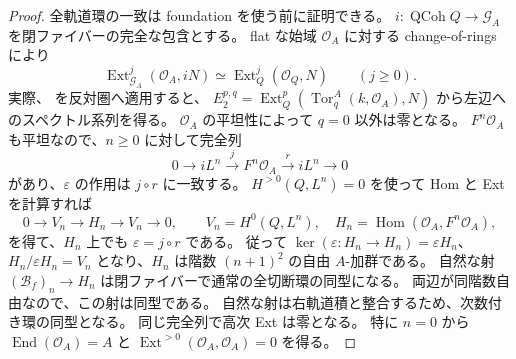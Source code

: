\begin{proof}
全軌道環の一致は foundation を使う前に証明できる。
$i:\operatorname{QCoh}Q\to\mathcal G_A$ を閉ファイバーの完全な包含とする。
flat な始域 $\mathcal O_A$ に対する change-of-rings により
\[
 \operatorname{Ext}^j_{\mathcal G_A}(\mathcal O_A,iN)
 \simeq\operatorname{Ext}^j_Q(\mathcal O_Q,N)\qquad(j\ge0).
\]
実際、\cite[Proposition 4.7]{LowenVanDenBergh2006} を反対圏へ適用すると、
$E_2^{p,q}=\operatorname{Ext}^p_Q(\operatorname{Tor}^A_q(k,\mathcal O_A),N)$
から左辺へのスペクトル系列を得る。
$\mathcal O_A$ の平坦性によって $q=0$ 以外は零となる。
$F^n\mathcal O_A$ も平坦なので、$n\ge0$ に対して完全列
\[
 0\longrightarrow iL^n\xrightarrow{j}F^n\mathcal O_A
   \xrightarrow{r}iL^n\longrightarrow0
\]
があり、$\varepsilon$ の作用は $j\circ r$ に一致する。
$H^{>0}(Q,L^n)=0$ を使って Hom と Ext を計算すれば
\[
 0\longrightarrow V_n\longrightarrow H_n\longrightarrow V_n\longrightarrow0,
 \qquad V_n=H^0(Q,L^n),\quad
 H_n=\operatorname{Hom}(\mathcal O_A,F^n\mathcal O_A),
\]
を得て、$H_n$ 上でも $\varepsilon=j\circ r$ である。
従って $\ker(\varepsilon:H_n\to H_n)=\varepsilon H_n$、
$H_n/\varepsilon H_n=V_n$ となり、$H_n$ は階数 $(n+1)^2$ の自由 $A$-加群である。
自然な射 $(\mathcal B_f)_n\to H_n$ は閉ファイバーで通常の全切断環の同型になる。
両辺が同階数自由なので、この射は同型である。
自然な射は右軌道積と整合するため、次数付き環の同型となる。
同じ完全列で高次 Ext は零となる。
特に $n=0$ から $\operatorname{End}(\mathcal O_A)=A$ と
$\operatorname{Ext}^{>0}(\mathcal O_A,\mathcal O_A)=0$ を得る。
\end{proof}

